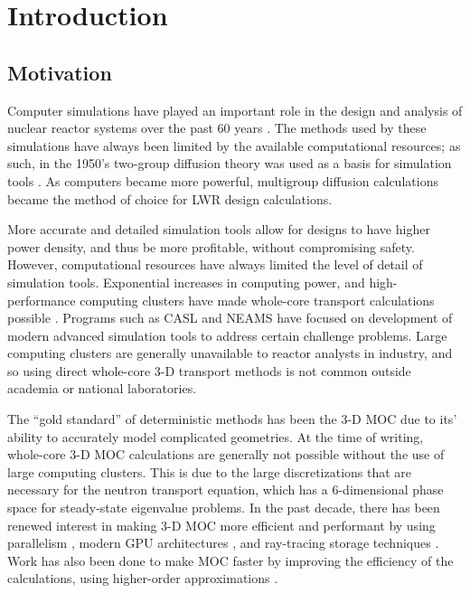 \chapter{Introduction}{\label{ch:Introduction}
    \section{Motivation}{\label{sec:Introduction:Motivation}
        Computer simulations have played an important role in the design and analysis of nuclear reactor systems over the past 60 years \cite{FewGroupDiffusion}.
        The methods used by these simulations have always been limited by the available computational resources; as such, in the 1950's two-group diffusion theory was used as a basis for simulation tools \cite{FewGroupDiffusion}.
        As computers became more powerful, multigroup diffusion calculations became the method of choice for \ac{LWR} design calculations.

        More accurate and detailed simulation tools allow for designs to have higher power density, and thus be more profitable, without compromising safety.
        However, computational resources have always limited the level of detail of simulation tools.
        Exponential increases in computing power, and high-performance computing clusters have made whole-core transport calculations possible \cite{CASMO-4,Apollo2-2010,DeCART,Denovo,Yang2010,Boyd2014,Collins2016,Gunow2018}.
        Programs such as \ac{CASL} and \ac{NEAMS} have focused on development of modern advanced simulation tools to address certain challenge problems.
        Large computing clusters are generally unavailable to reactor analysts in industry, and so using direct whole-core 3-D transport methods is not common outside academia or national laboratories.

        The ``gold standard'' of deterministic methods has been the 3-D \ac{MOC} \cite{Askew1972} due to its' ability to accurately model complicated geometries.
        At the time of writing, whole-core 3-D \ac{MOC} calculations are generally not possible without the use of large computing clusters.
        This is due to the large discretizations that are necessary for the neutron transport equation, which has a 6-dimensional phase space for steady-state eigenvalue problems.
        In the past decade, there has been renewed interest in making 3-D \ac{MOC} more efficient and performant by using parallelism \cite{Kochunas2013}, modern \ac{GPU} architectures \cite{Boyd2014}, and ray-tracing storage techniques \cite{Sciannandrone2016, Gunow2016}.
        Work has also been done to make \ac{MOC} faster by improving the efficiency of the calculations, using higher-order approximations \cite{Ferrer2016,Gunow2018}.

}}
